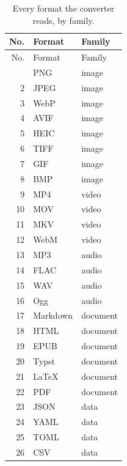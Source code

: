 \documentclass[11pt]{article}
\begin{document}
\begin{longtable}{rll}
  \caption{Every format the converter reads, by family.}\label{tab:long} \\
  \toprule
  No. & Format & Family \\
  \midrule
  \endfirsthead
  \toprule
  No. & Format & Family \\
  \midrule
  \endhead
  \bottomrule
  \endfoot
  1  & PNG       & image \\
  2  & JPEG      & image \\
  3  & WebP      & image \\
  4  & AVIF      & image \\
  5  & HEIC      & image \\
  6  & TIFF      & image \\
  7  & GIF       & image \\
  8  & BMP       & image \\
  9  & MP4       & video \\
  10 & MOV       & video \\
  11 & MKV       & video \\
  12 & WebM      & video \\
  13 & MP3       & audio \\
  14 & FLAC      & audio \\
  15 & WAV       & audio \\
  16 & Ogg       & audio \\
  17 & Markdown  & document \\
  18 & HTML      & document \\
  19 & EPUB      & document \\
  20 & Typst     & document \\
  21 & LaTeX     & document \\
  22 & PDF       & document \\
  23 & JSON      & data \\
  24 & YAML      & data \\
  25 & TOML      & data \\
  26 & CSV       & data \\
\end{longtable}
\end{document}
